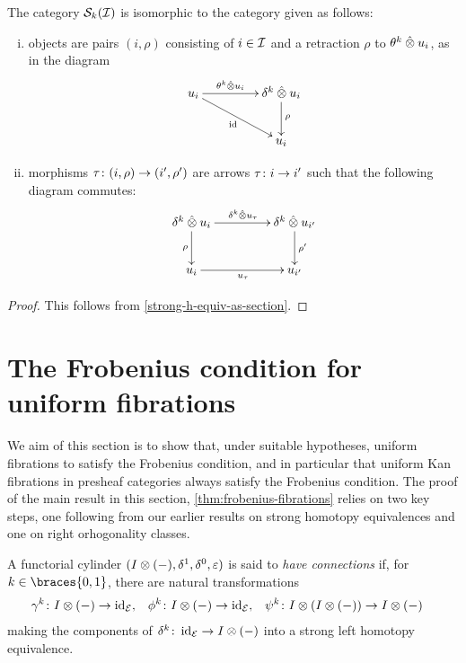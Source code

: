 \documentclass[reqno,10pt,a4paper,oneside,draft]{amsart}
\begin{document}
\begin{lemma} \label{strong-h-equiv-as-section-algebraic}
The category $\cal{S}_k(\cal{I})$ is isomorphic to the category given as follows:
\begin{enumerate}[(i)]
\item objects are pairs $(i, \rho)$ consisting of $i \in \cal{I}$ and a retraction $\rho$ to $\thetak \hatotimes u_i$, as in the diagram
\[
\xymatrix@C+2em{
  u_i
  \ar[r]^-{\thetak \hatotimes u_i }
  \ar[dr]_{\id}
&
  \kcyl \hatotimes u_i \ar[d]^{\rho}
\\&
  u_i
}
\]
\item morphisms $\tau \co (i, \rho) \to (i', \rho')$ are arrows $\tau \co i \to i'$ such that the following diagram commutes:
\[
\xymatrix@C+2em{
  \kcyl \hatotimes u_i
  \ar[d]_-{\rho}
  \ar[r]^{\kcyl \hatotimes u_\tau }
&
 \kcyl \hatotimes u_{i'}
  \ar[d]^-{\rho'}
\\
  u_i
  \ar[r]_{u_\tau}
&
  u_{i'}
}
\]
\end{enumerate}
\end{lemma}

\begin{proof}
This follows from \cref{strong-h-equiv-as-section}.
\end{proof}



\section{The Frobenius condition for uniform fibrations}
\label{sec:frocuf}

We aim of this section is to show that, under suitable hypotheses, uniform fibrations to satisfy the Frobenius condition, and in particular that uniform Kan fibrations in presheaf categories always satisfy the Frobenius condition.
The proof of the main result in this section, \cref{thm:frobenius-fibrations} relies on two key steps, one following from our earlier results on strong homotopy equivalences and one on right orhogonality classes.

\begin{definition}
A functorial cylinder $(\interval \otimes (-), \rcyl, \lcyl, \ccyl)$ is said to \emph{have connections} if, for $k \in \braces{0, 1}$, there are natural transformations
\begin{align*}
  \gamma^k &\co \interval \otimes (-) \to \id_\catE
,&
  \phi^k &\co \interval \otimes (-) \to \id_\catE
,&
  \psi^k &\co \interval \otimes (\interval \otimes (-)) \to \interval \otimes (-)
\end{align*}
making the components of $\kcyl \co \id_\cal{E} \to \interval \otimes (-)$ into a strong left homotopy equivalence.
\end{definition}
\end{document}
